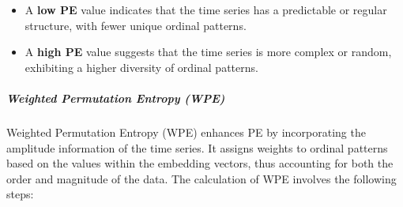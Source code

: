 \begin{itemize} \item A \textbf{low PE} value indicates that the time series has a predictable or regular structure, with fewer unique ordinal patterns. \item A \textbf{high PE} value suggests that the time series is more complex or random, exhibiting a higher diversity of ordinal patterns. \end{itemize}


\subparagraph{Weighted Permutation Entropy (WPE)}
Weighted Permutation Entropy (WPE) enhances PE by incorporating the amplitude information of the time series. It assigns weights to ordinal patterns based on the values within the embedding vectors, thus accounting for both the order and magnitude of the data.
The calculation of \ac{WPE} involves the following steps:

